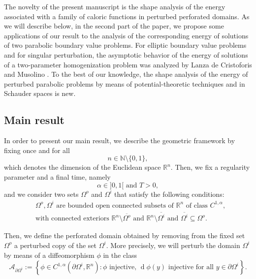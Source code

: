 \documentclass[11pt,reqno,a4paper]{amsart}
\theoremstyle{plain}
\theoremstyle{definition}
\newcommand{\R}{\mathbb{R}}
\renewcommand{\d}[1]{\ensuremath{\operatorname{d}\!{#1}}}
\begin{document}
The novelty of the present manuscript is the shape analysis of the energy associated with a family of caloric functions in perturbed perforated domains. As we will describe below, in the second part of the paper, we propose some applications of our result to the analysis of the corresponding energy of solutions of two parabolic boundary value problems. For elliptic boundary value problems and for singular perturbation, the asymptotic behavior of the energy of solutions of a two-parameter homogenization problem was analyzed by Lanza de Cristoforis and Musolino \cite{LaMu19}. To the best of our knowledge, the shape analysis of the energy of perturbed parabolic problems by means of potential-theoretic techniques and in Schauder spaces is new.

\subsection{Main result}
In order to present our main result, we describe the geometric framework by fixing once and for all 
\begin{equation*}
    n \in \mathbb{N} \setminus \{0,1\},
\end{equation*}
which denotes the dimension of the Euclidean space $\mathbb{R}^n$. Then, we fix a regularity parameter and a final time, namely
\begin{equation*}
    \alpha \in ]0,1[ \text{ and } T>0,
\end{equation*}
and we consider two sets $\Omega^o$ and $\Omega^i$ that satisfy the following conditions:
\begin{equation}\label{introsetconditions}
    \begin{split}
        &\Omega^o, \Omega^i  \text{ are bounded open connected subsets of } \R^n \text{ of class } C^{1,\alpha}, 
        \\
        &\text{with connected exteriors } \R^n\setminus \overline{\Omega^o} \text{ and } \R^n \setminus \overline{\Omega^i} \text{ and } \overline{\Omega^i} \subseteq\Omega^o.
    \end{split}
\end{equation}

Then, we define the perforated domain obtained by removing from the fixed set $\Omega^o$ a perturbed copy of the set $\Omega^i$. More precisely, we will perturb the domain $\Omega^i$ by means of a diffeomorphism $\phi$ in the class
\begin{equation*}
    \mathcal{A}_{\partial\Omega^i} := \left\{ \phi \in C^{1,\alpha}(\partial\Omega^i,\R^n) : \phi \text{ injective}, \, \d \phi(y) \text{ injective for all } y \in \partial\Omega^i \right\}.
\end{equation*}
\end{document}
